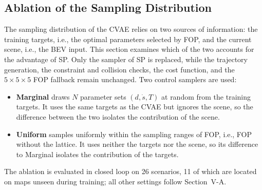 \subsection{Ablation of the Sampling Distribution}
\label{sec:ablation}

The sampling distribution of the CVAE relies on two sources of information: the training targets, i.e., the optimal parameters selected by FOP, and the current scene, i.e., the BEV input.
This section examines which of the two accounts for the advantage of SP.
Only the sampler of SP is replaced, while the trajectory generation, the constraint and collision checks, the cost function, and the $5\times5\times5$ FOP fallback remain unchanged.
Two control samplers are used:
\begin{itemize}
  \item \textbf{Marginal} draws $N$ parameter sets $(d, \dot{s}, T)$ at random from the training targets. It uses the same targets as the CVAE but ignores the scene, so the difference between the two isolates the contribution of the scene.
  \item \textbf{Uniform} samples uniformly within the sampling ranges of FOP, i.e., FOP without the lattice. It uses neither the targets nor the scene, so its difference to Marginal isolates the contribution of the targets.
\end{itemize}
The ablation is evaluated in closed loop on 26 scenarios, 11 of which are located on maps unseen during training; all other settings follow Section~V-A.

